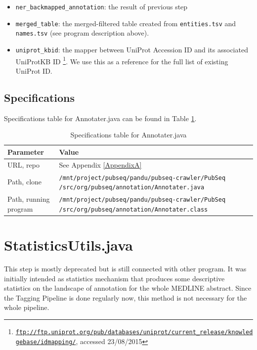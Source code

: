 \begin{itemize}
\item \texttt{ner\_backmapped\_annotation}: the result of previous step
\item \texttt{merged\_table}: the merged-filtered table created from \texttt{entities.tsv} and \texttt{names.tsv} (see program description above).
\item \texttt{uniprot\_kbid}: the mapper between UniProt Accession ID and its associated UniProtKB ID \footnote{ \href{ftp://ftp.uniprot.org/pub/databases/uniprot/current_release/knowledgebase/idmapping/}{\texttt{ftp://ftp.uniprot.org/pub/databases/uniprot/current\_release/knowledgebase/idmapping/}}, accessed 23/08/2015}. We use this as a reference for the full list of existing UniProt ID.
\end{itemize}

\subsection{Specifications}

Specifications table for Annotater.java can be found in Table \ref{tab:Annotater}.

\begin{table}[htbp]
\caption{Specifications table for Annotater.java}
\centering
\begin{tabularx}{\textwidth}{ | l | X | }
  \hline
  Parameter & Value \\
  \hline
  URL, repo & See Appendix \ref{AppendixA} \\
  Path, clone & \texttt{/mnt/project/pubseq/pandu/pubseq-crawler/PubSeq /src/org/pubseq/annotation/Annotater.java} \\
  Path, running program & \texttt{/mnt/project/pubseq/pandu/pubseq-crawler/PubSeq /src/org/pubseq/annotation/Annotater.class}\\
  \hline
\end{tabularx}
\label{tab:Annotater}
\end{table}


\section{StatisticsUtils.java}


This step is mostly deprecated but is still connected with other program. It was initially intended as statistics mechanism that produces some descriptive statistics on the landscape of annotation for the whole MEDLINE abstract. Since the Tagging Pipeline is done regularly now, this method is not necessary for the whole pipeline.

